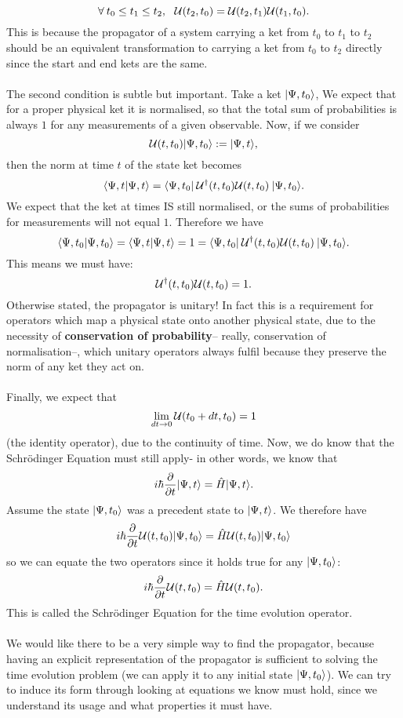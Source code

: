 $$
\forall\: t_{0}\leq t_{1} \leq t_{2}, \:\:\: \mathcal{U}(t_{2},t_{0})=\mathcal{U}(t_{2},t_{1})\mathcal{U}(t_{1},t_{0}).
$$
This is because the propagator of a system carrying a ket from $t_{0}$ to $t_{1}$ to $t_{2}$ should be an equivalent transformation to carrying a ket from $t_{0}$ to $t_{2}$ directly since the start and end kets are the same.
\\\\
The second condition is subtle but important. Take a ket $|\Psi,{t_{0}}\rangle$, We expect that for a proper physical ket it is normalised, so that the total sum of probabilities is always $1$ for any measurements of a given observable. Now, if we consider
$$
\mathcal{U}(t,t_{0})|\Psi,{t_{0}}\rangle:=|\Psi,{t}\rangle,
$$
then the norm at time $t$ of the state ket becomes
$$
\langle\Psi,{t}|\Psi,{t}\rangle= \langle\Psi,{t_{0}}|\:{\mathcal{U}^{\dagger}(t,t_{0})\mathcal{U}(t,t_{0})}\:|\Psi,{t_{0}}\rangle.
$$
We expect that the ket at times IS still normalised, or the sums of probabilities for measurements will not equal $1$.
Therefore we have 
$$
\langle\Psi,t_{0}|\Psi,t_{0}\rangle=\langle\Psi,t|\Psi,t\rangle=1=\langle\Psi,{t_{0}}|\:{\mathcal{U}^{\dagger}(t,t_{0})\mathcal{U}(t,t_{0})}\:|\Psi,{t_{0}}\rangle.
$$
This means we must have:
$$
{\mathcal{U}^{\dagger}(t,t_{0})\mathcal{U}(t,t_{0})}=1.
$$
Otherwise stated, the propagator is unitary! In fact this is a requirement for operators which map a physical state onto another physical state, due to the necessity of \textbf{conservation of probability}-- really, conservation of normalisation--, which unitary operators always fulfil because they preserve the norm of any ket they act on. 
\\\\
Finally, we expect that 
$$
\lim_{dt\to0}\mathcal{U}(t_{0}+dt,t_{0})=1
$$
(the identity operator), due to the continuity of time. Now, we do know that the Schr\"{o}dinger Equation must still apply- in other words, we know that
$$
i\hbar\frac{\partial}{\partial t}|\Psi,{t}\rangle=\hat{H}|\Psi,{t}\rangle.
$$
Assume the state $|\Psi,t_{0}\rangle$ was a precedent state to $|\Psi,t\rangle$. We therefore have
$$
i\hbar\frac{\partial}{\partial t}\mathcal{U}(t,t_{0})|\Psi,{t_{0}}\rangle=\hat{H}\mathcal{U}(t,t_{0})|\Psi,{t_{0}}\rangle
$$
so we can equate the two operators since it holds true for any $|\Psi,t_{0}\rangle$:
$$
i\hbar\frac{\partial}{\partial t}\mathcal{U}(t,t_{0})=\hat{H}\mathcal{U}(t,t_{0}).
$$
This is called the Schr\"{o}dinger Equation for the time evolution operator.
\\\\
We would like there to be a very simple way to find the propagator, because having an explicit representation of the propagator is sufficient to solving the time evolution problem (we can apply it to any initial state $|\Psi,t_{0}\rangle$). We can try to induce its form through looking at equations we know must hold, since we understand its usage and what properties it must have.
